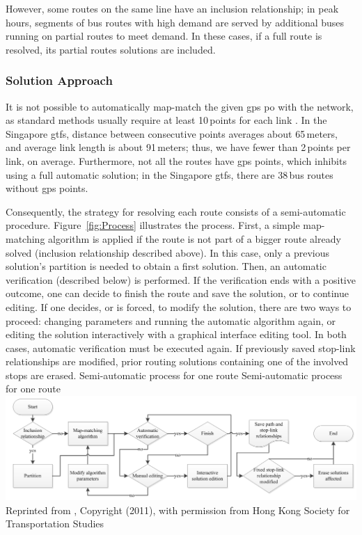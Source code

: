 However, some routes on the same line have an inclusion relationship; in peak hours, segments of bus routes with high demand are served by additional buses running on partial routes to meet demand. In these cases, if a full route is resolved, its partial routes solutions are included.

\subsubsection{Solution Approach}
It is not possible to automatically map-match the given \gls{gps} po with the network, as standard methods usually require at least 10\,points for each link \citep[][]{SchuesslerAxhausen_TechRep_IVT_2009}. In the Singapore \gls{gtfs}, distance between consecutive points averages about 65\,meters, and average link length is about 91\,meters; thus, we have fewer than 2\,points per link, on average. Furthermore, not all the routes have \gls{gps} points, which inhibits using a full automatic solution; in the Singapore \gls{gtfs}, there are 38\,bus routes without \gls{gps} points.

Consequently, the strategy for resolving each route consists of a semi-automatic procedure. Figure~\ref{fig:Process} illustrates the process. First, a simple map-matching algorithm is applied if the route is not part of a bigger route already solved (inclusion relationship described above). In this case, only a previous solution's partition is needed to obtain a first solution. Then, an automatic verification (described below) is performed. If the verification ends with a positive outcome, one can decide to finish the route and save the solution, or to continue editing. If one decides, or is forced, to modify the solution, there are two ways to proceed: changing parameters and running the automatic algorithm again, or editing the solution interactively with a graphical interface editing tool. In both cases, automatic verification must be executed again. If previously saved stop-link relationships are modified, prior routing solutions containing one of the involved stops are erased.
%
\createfigure
{Semi-automatic process for one route}
{Semi-automatic process for one route}
{\label{fig:Process}}
{\includegraphics[width=1.0\textwidth]{extending/figures/semiAuto/Process.png}}
{Reprinted from \citet[][p.754]{Ordonez_HKSTS_2011}, Copyright (2011), with permission from Hong Kong Society for Transportation Studies}

